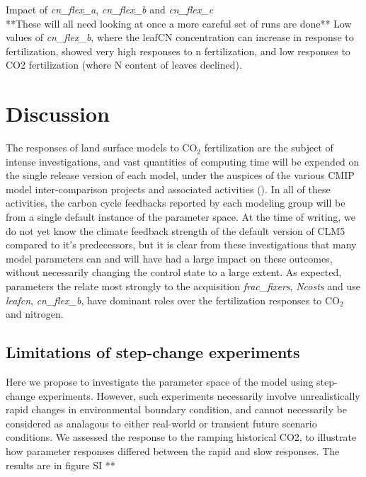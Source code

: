 \documentclass[draft,linenumbers]{agujournal}
\begin{document}
Impact of \emph{cn\_flex\_a},  \emph{cn\_flex\_b} and \emph{cn\_flex\_c}\\
**These will all need looking at once a more careful set of runs are done**
Low values of \emph{cn\_flex\_b}, where the leafCN concentration can increase in response to fertilization, showed very high responses to n fertilization, and low responses to CO2 fertilization (where N content of leaves declined). 


\section{Discussion}
The responses of land surface models to CO$_{2}$ fertilization are the subject of intense investigations, and vast quantities of computing time will be expended on the single release version of each model, under the auspices of the various CMIP model inter-comparison projects and associated activities  (\cite{meehl2014}). In all of these activities, the carbon cycle feedbacks reported by each modeling group will be from a single default instance of the parameter space.  At the time of writing, we do not yet know the climate feedback strength of the default version of CLM5 compared to it's predecessors, but it is clear from these investigations that many model parameters can and will have had a large impact on these outcomes, without necessarily changing the control state to a large extent. As expected, parameters the relate most strongly to the acquisition \emph{frac\_fixers}, \emph{Ncosts} and use \emph{leafcn}, \emph{cn\_flex\_b}, have dominant roles over the fertilization responses to CO$_{2}$ and nitrogen. 

\subsection{Limitations of step-change experiments}
Here we propose to investigate the parameter space of the model using step-change experiments. However, such experiments necessarily involve unrealistically rapid changes in environmental boundary condition, and cannot necessarily be considered as analagous to either real-world or transient future scenario conditions. We assessed the response to the ramping historical CO2, to illustrate how parameter responses differed between the rapid and slow responses. The results are in figure SI **
\end{document}
